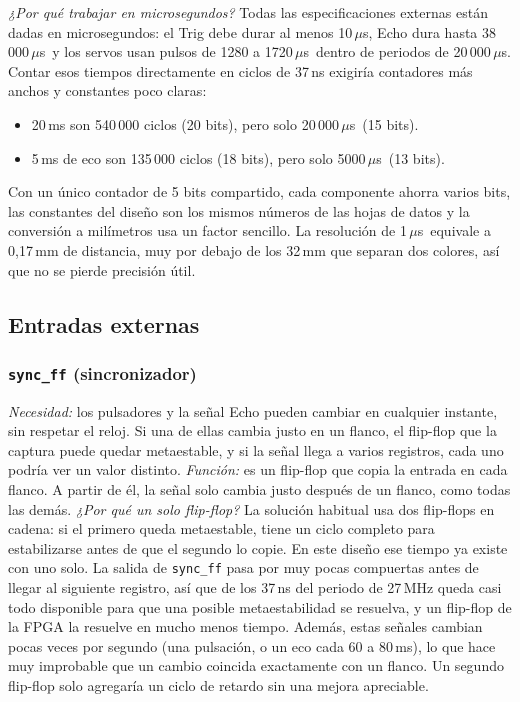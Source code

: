 \documentclass[conference]{IEEEtran}
\newcommand{\mo}[1]{\texttt{#1}}
\newcommand{\us}{\,$\mu$s}
\begin{document}
\emph{¿Por qué trabajar en microsegundos?} Todas las especificaciones externas están dadas en microsegundos: el Trig debe durar al menos 10\us, Echo dura hasta 38\,000\us\ y los servos usan pulsos de 1280 a 1720\us\ dentro de periodos de 20\,000\us. Contar esos tiempos directamente en ciclos de 37\,ns exigiría contadores más anchos y constantes poco claras:
\begin{itemize}
\item 20\,ms son 540\,000 ciclos (20 bits), pero solo 20\,000\us\ (15 bits).
\item 5\,ms de eco son 135\,000 ciclos (18 bits), pero solo 5000\us\ (13 bits).
\end{itemize}
Con un único contador de 5 bits compartido, cada componente ahorra varios bits, las constantes del diseño son los mismos números de las hojas de datos y la conversión a milímetros usa un factor sencillo. La resolución de 1\us\ equivale a 0,17\,mm de distancia, muy por debajo de los 32\,mm que separan dos colores, así que no se pierde precisión útil.

\subsection{Entradas externas}

\subsubsection{\mo{sync\_ff} (sincronizador)}
\emph{Necesidad:} los pulsadores y la señal Echo pueden cambiar en cualquier instante, sin respetar el reloj. Si una de ellas cambia justo en un flanco, el flip-flop que la captura puede quedar metaestable, y si la señal llega a varios registros, cada uno podría ver un valor distinto.
\emph{Función:} es un flip-flop que copia la entrada en cada flanco. A partir de él, la señal solo cambia justo después de un flanco, como todas las demás.
\emph{¿Por qué un solo flip-flop?} La solución habitual usa dos flip-flops en cadena: si el primero queda metaestable, tiene un ciclo completo para estabilizarse antes de que el segundo lo copie. En este diseño ese tiempo ya existe con uno solo. La salida de \mo{sync\_ff} pasa por muy pocas compuertas antes de llegar al siguiente registro, así que de los 37\,ns del periodo de 27\,MHz queda casi todo disponible para que una posible metaestabilidad se resuelva, y un flip-flop de la FPGA la resuelve en mucho menos tiempo. Además, estas señales cambian pocas veces por segundo (una pulsación, o un eco cada 60 a 80\,ms), lo que hace muy improbable que un cambio coincida exactamente con un flanco. Un segundo flip-flop solo agregaría un ciclo de retardo sin una mejora apreciable.
\end{document}
